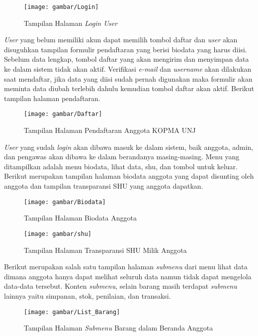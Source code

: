 \begin{figure}[H]
	\centering
	\texttt{[image: gambar/Login]}
	\caption{Tampilan Halaman \emph{Login User}}
\end{figure}

\emph{User} yang belum memiliki akun dapat memilih tombol daftar dan \emph{user} akan disuguhkan tampilan formulir pendaftaran yang berisi biodata yang harus diisi. Sebelum data lengkap, tombol daftar yang akan mengirim dan menyimpan data ke dalam sistem tidak akan aktif. Verifikasi \emph{e-mail} dan \emph{username} akan dilakukan saat mendaftar, jika data yang diisi sudah pernah digunakan maka formulir akan meminta data diubah terlebih dahulu kemudian tombol daftar akan aktif. Berikut tampilan halaman pendaftaran. 

\begin{figure}[H]
	\centering
	\texttt{[image: gambar/Daftar]}
	\caption{Tampilan Halaman Pendaftaran Anggota KOPMA UNJ}
\end{figure}

\emph{User} yang sudah \emph{login} akan dibawa masuk ke dalam sistem, baik anggota, admin, dan pengawas akan dibawa ke dalam berandanya masing-masing. Menu yang ditampilkan adalah menu biodata, lihat data, shu, dan tombol untuk keluar. Berikut merupakan tampilan halaman biodata  anggota yang dapat disunting oleh anggota dan tampilan transparansi SHU yang anggota dapatkan.  
	
\begin{figure}[H]
	\centering
	\texttt{[image: gambar/Biodata]}
	\caption{Tampilan Halaman Biodata Anggota}
\end{figure}	

\begin{figure}[H]
	\centering
	\texttt{[image: gambar/shu]}
	\caption{Tampilan Halaman Transparansi SHU Milik Anggota}
\end{figure}	

Berikut merupakan salah satu tampilan halaman \emph{submenu} dari menu lihat data dimana anggota hanya dapat melihat seluruh data namun tidak dapat mengelola data-data tersebut. Konten \emph{submenu}, selain barang masih terdapat \emph{submenu} lainnya yaitu simpanan, stok, penilaian, dan transaksi.

\begin{figure}[H]
	\centering
	\texttt{[image: gambar/List\_Barang]}
	\caption{Tampilan Halaman \emph{Submenu} Barang dalam Beranda Anggota}
\end{figure}
	
